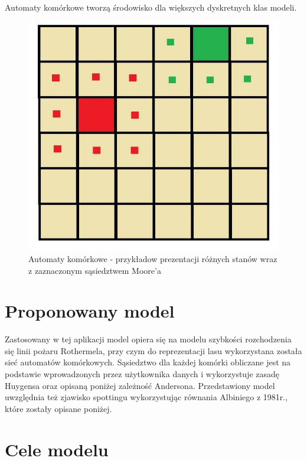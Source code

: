 \documentclass[a4paper, 11pt]{article}
\begin{document}
	Automaty komórkowe tworzą środowisko dla większych dyskretnych klas modeli.
	\begin{figure}[H]
		\centerline{\includegraphics[scale=0.4]{automaty}}
		\raggedright{	\caption{Automaty komórkowe - przykładow prezentacji różnych stanów wraz z zaznaczonym sąsiedztwem Moore'a}}
	\end{figure}
	
	\section{Proponowany model}
	\indent
	
	Zastosowany w tej aplikacji model opiera się na modelu szybkości rozchodzenia się linii pożaru Rothermela, przy czym do reprezentacji lasu wykorzystana została sieć automatów komórkowych. Sąsiedztwo dla każdej komórki obliczane jest na podstawie wprowadzonych przez użytkownika danych i wykorzystuje zasadę Huygensa oraz opisaną poniżej zależność Andersona. Przedstawiony model uwzględnia też zjawisko spottingu wykorzystując równania Albiniego z 1981r., które zostały opisane poniżej.\\
	
	\section*{Cele modelu}
	\indent
	
\end{document}
